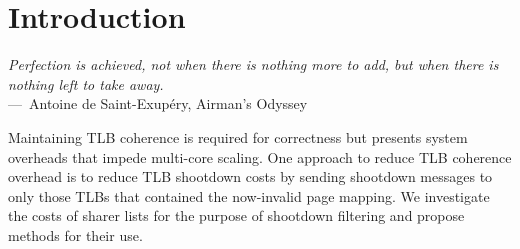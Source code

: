 
\chapter{Introduction}
\label{ch:Introduction}

\begin{epigraph}
	\emph{Perfection is achieved, not when there is nothing more to add, but when there is nothing left to take away.}\\
	---~Antoine de Saint-Exupéry, Airman's Odyssey
\end{epigraph}

Maintaining TLB coherence is required for correctness but presents system overheads that impede multi-core scaling. One approach to reduce TLB coherence  overhead is to reduce TLB shootdown costs by sending shootdown messages to only those TLBs that contained the now-invalid page mapping. We investigate the costs of sharer lists for the purpose of shootdown filtering and propose methods for their use.

\endinput
